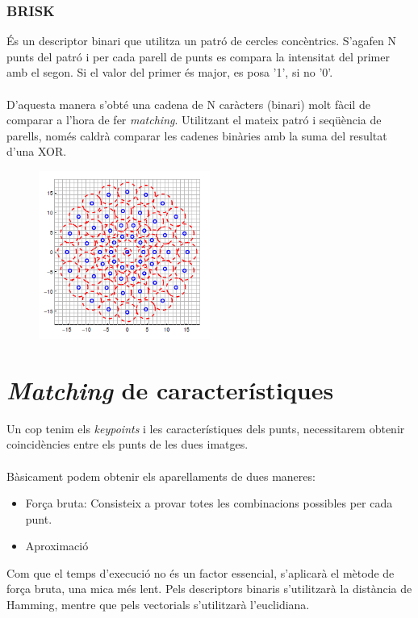 	\subsubsection{BRISK}
	És un descriptor binari que utilitza un patró de cercles concèntrics. S'agafen N punts del patró i per cada parell de punts es compara la intensitat del primer amb el segon. Si el valor del primer és
	major, es posa '1', si no '0'.\\\\
	D'aquesta manera s'obté una cadena de N caràcters (binari) molt fàcil de comparar a l'hora de fer \textit{matching}. Utilitzant el mateix patró i seqüència de parells, només caldrà
	comparar les cadenes binàries amb la suma del resultat d'una XOR.
	\begin{figure}[H]
		\centering
		\includegraphics[width=0.5\textwidth]{images/brisk}
	\end{figure}

\section{\textit{Matching} de característiques}

	Un cop tenim els \textit{keypoints} i les característiques dels punts, necessitarem obtenir coincidències entre els punts de les dues imatges.\\\\
	Bàsicament podem obtenir els aparellaments de dues maneres:\\
	\begin{itemize}	
		\item{Força bruta: Consisteix a provar totes les combinacions possibles per cada punt.}
		\item{Aproximació\\}
	\end{itemize}
	Com que el temps d'execució no és un factor essencial, s'aplicarà el mètode de força bruta, una mica més lent. Pels descriptors binaris s'utilitzarà la distància de Hamming, mentre que pels vectorials
	s'utilitzarà l'euclidiana.\\

